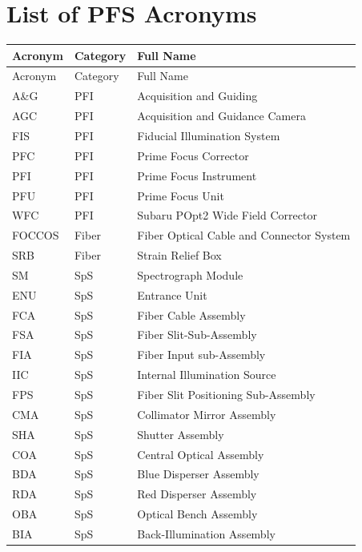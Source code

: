 \documentclass[a4paper]{article}
\begin{document}
\subsection{}

\clearpage
\section{List of PFS Acronyms}

\begin{longtable}{lll}
\hline
Acronym	& Category &	Full Name \\
\hline
\endfirsthead
\hline
Acronym	& Category &	Full Name \\
\hline
\endhead
\hline
A\&G	& PFI	& Acquisition and Guiding \\
AGC	& PFI	& Acquisition and Guidance Camera \\
FIS	& PFI	& Fiducial Illumination System \\
PFC	& PFI	& Prime Focus Corrector \\
PFI	& PFI	& Prime Focus Instrument \\
PFU	& PFI	& Prime Focus Unit \\
WFC	 & PFI	& Subaru POpt2 Wide Field Corrector \\
FOCCOS	& Fiber	& Fiber Optical Cable and Connector System \\
SRB	& Fiber	& Strain Relief Box \\
SM	& SpS	& Spectrograph Module \\
ENU	& SpS	& Entrance Unit \\
FCA	& SpS	& Fiber Cable Assembly \\
FSA	& SpS	& Fiber Slit-Sub-Assembly \\
FIA	& SpS	& Fiber Input sub-Assembly \\
IIC	& SpS	& Internal Illumination Source \\
FPS	& SpS	& Fiber Slit Positioning Sub-Assembly \\
CMA	& SpS	& Collimator Mirror Assembly \\
SHA	& SpS	& Shutter Assembly \\
COA	& SpS	& Central Optical Assembly \\
BDA	& SpS	& Blue Disperser Assembly \\
RDA	& SpS	& Red Disperser Assembly \\
OBA	& SpS	& Optical Bench Assembly \\
BIA	& SpS	& Back-Illumination Assembly \\

\end{longtable}
\end{document}
